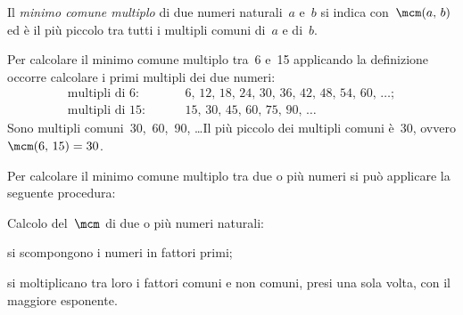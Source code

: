 \begin{definizione}
 Il \emph{minimo comune multiplo} di due numeri naturali~$a$ e~$b$ si indica con~$\mcm(a\text{,~}b)$ ed è il più
piccolo tra tutti i multipli comuni di~$a$ e di~$b$.
\end{definizione}

Per calcolare il minimo comune multiplo tra~6 e~15 applicando la definizione occorre calcolare i primi
multipli dei due numeri:
\begin{align*}
\text{multipli di }6: & \qquad~6\text{, }12\text{, }18\text{, }24\text{, }30\text{, }36\text{, }42\text{, }48\text{, }54\text{, }60\text{, }\ldots; \\
\text{multipli di }15: & \qquad~15\text{, }30\text{, }45\text{, }60\text{, }75\text{, }90\text{, }\ldots
\end{align*}
Sono multipli comuni~30,~60,~90, \ldots Il più piccolo dei multipli comuni è~30, ovvero $\mcm(6\text{,~}15)=30$.

Per calcolare il minimo comune multiplo tra due o più numeri si può applicare la seguente procedura:
\begin{procedura}
Calcolo del~$\mcm$ di due o più numeri naturali:
\begin{enumeratea}
 \item si scompongono i numeri in fattori primi;
 \item si moltiplicano tra loro i fattori comuni e non comuni, presi una sola volta, con il maggiore
esponente.
\end{enumeratea}
\end{procedura}

